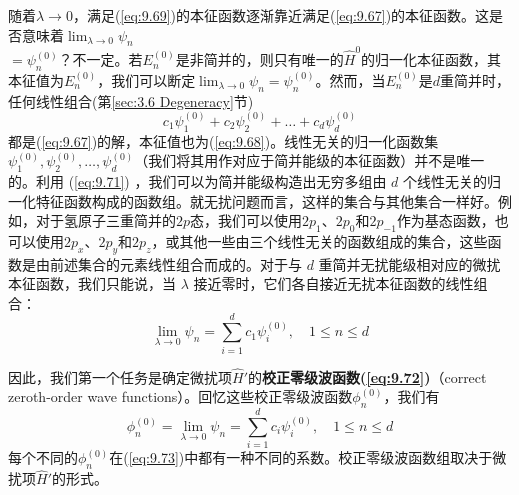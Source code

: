    随着$\lambda \to 0$，满足(\ref{eq:9.69})的本征函数逐渐靠近满足(\ref{eq:9.67})的本征函数。这是否意味着$\lim_{\lambda \to 0} \psi_n $\\$= \psi_n^{\left(0\right)}$？不一定。若$E_n^{\left(0\right)}$是非简并的，则只有唯一的$\hat{H}^0$的归一化本征函数，其本征值为$E_n^{\left(0\right)}$，我们可以断定$\lim_{\lambda \to 0} \psi_n = \psi_n^{\left(0\right)}$。然而，当$E_n^{\left(0\right)}$是$d$重简并时，任何线性组合(第\ref{sec:3.6 Degeneracy}节)
    \begin{equation}
        c_1\psi_1^{\left(0\right)} + c_2\psi_2^{\left(0\right)} + \ldots + c_d\psi_d^{\left(0\right)}
        \label{eq:9.71}
    \end{equation}
    都是(\ref{eq:9.67})的解，本征值也为(\ref{eq:9.68})。线性无关的归一化函数集 $\psi_1^{\left(0\right)}, \psi_2^{\left(0\right)},\ldots,\psi_d^{\left(0\right)}$（我们将其用作对应于简并能级的本征函数）并不是唯一的。利用 (\ref{eq:9.71}) ，我们可以为简并能级构造出无穷多组由 $d$ 个线性无关的归一化特征函数构成的函数组。就无扰问题而言，这样的集合与其他集合一样好。例如，对于氢原子三重简并的$2p$态，我们可以使用$2p_1$、$2p_0$和$2p_{-1}$作为基态函数，也可以使用$2p_x$、$2p_y$和$2p_z$，或其他一些由三个线性无关的函数组成的集合，这些函数是由前述集合的元素线性组合而成的。对于与 $d$ 重简并无扰能级相对应的微扰本征函数，我们只能说，当 $\lambda$ 接近零时，它们各自接近无扰本征函数的线性组合：
    \begin{equation}
        \lim_{\lambda \to 0} \psi_n = \sum_{i=1}^{d}c_1\psi_i^{\left(0\right)}, \quad 1 \leq n \leq d
        \label{eq:9.72}
    \end{equation}

    因此，我们第一个任务是确定微扰项$\hat{H}'$的\textbf{校正零级波函数(\ref{eq:9.72})}（correct zeroth-order wave functions）。回忆这些校正零级波函数$\phi_n^{\left(0\right)}$，我们有
    \begin{equation}
        \phi_n^{\left(0\right)} = \lim_{\lambda \to 0} \psi_n = \sum_{i=1}^{d}c_i\psi_i^{\left(0\right)}, \quad 1 \leq n \leq d
        \label{eq:9.73}
    \end{equation}
    每个不同的$\phi_n^{\left(0\right)}$在(\ref{eq:9.73})中都有一种不同的系数。校正零级波函数组取决于微扰项$\hat{H}'$的形式。

